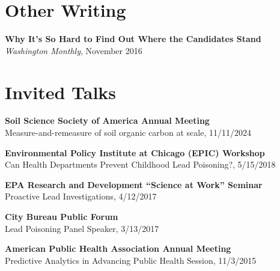 \documentclass[margin,line]{resume}
\begin{document}
\begin{resume}
        

        \section{\mysidestyle Other Writing}
        {\bf Why It's So Hard to Find Out Where the Candidates Stand} \\
        \textit{Washington Monthly}, November 2016

	\section{\mysidestyle Invited Talks}

    {\bf Soil Science Society of America Annual Meeting} \\
      Measure-and-remeasure of soil organic carbon at scale, 11/11/2024
        
	{\bf Environmental Policy Institute at Chicago (EPIC) Workshop} \\
        Can Health Departments Prevent Childhood Lead Poisoning?, 5/15/2018

	{\bf EPA Research and Development ``Science at Work'' Seminar} \\
        Proactive Lead Investigations, 4/12/2017

	{\bf City Bureau Public Forum} \\
        Lead Poisoning Panel Speaker, 3/13/2017 

	{\bf American Public Health Association Annual Meeting} \\
    Predictive Analytics in Advancing Public Health Session, 11/3/2015 


\end{resume}
\end{document}
